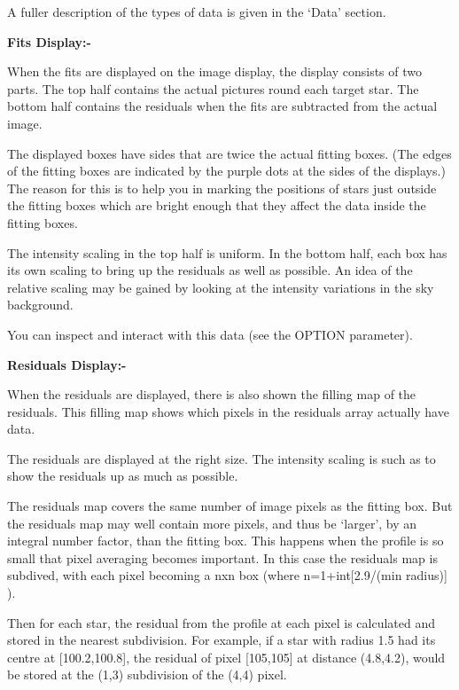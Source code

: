 \begin{small}
{{  A fuller description of the types of data is given in the `Data'
  section.

{\bf \hspace*{2em} Fits Display:-}

  When the fits are displayed on the image display, the display
  consists of two parts. The top half contains the actual pictures round
  each target star. The bottom half contains the residuals when the fits
  are subtracted from the actual image.

  The displayed boxes have sides that are twice the actual fitting
  boxes. (The edges of the fitting boxes are indicated by the purple
  dots at the sides of the displays.) The reason for this is to help
  you in marking the positions of stars just outside the fitting boxes
  which are bright enough that they affect the data inside the fitting
  boxes.

  The intensity scaling in the top half is uniform. In the bottom half,
  each box has its own scaling to bring up the residuals as well as
  possible. An idea of the relative scaling may be gained by looking at
  the intensity variations in the sky background.

  You can inspect and interact with this data (see the OPTION parameter).

{\bf \hspace*{2em} Residuals Display:-}

  When the residuals are displayed, there is also shown the filling map
  of the residuals. This filling map shows which pixels in the
  residuals array actually have data.

  The residuals are displayed at the right size. The intensity scaling is
  such as to show the residuals up as much as possible.

  The residuals map covers the same number of image pixels as the
  fitting box. But the residuals map may well contain more pixels, and
  thus be `larger', by an integral number factor, than the fitting box.
  This happens when the profile is so small that pixel averaging
  becomes important. In this case the residuals map is subdived, with
  each pixel becoming a nxn box (where n=1+int[2.9/(min radius)] ).

  Then for each star, the residual from the profile at each pixel is
  calculated and stored in the nearest subdivision. For example, if a
  star with radius 1.5 had its centre at [100.2,100.8], the residual of
  pixel [105,105] at distance (4.8,4.2), would be stored at the (1,3)
  subdivision of the (4,4) pixel.

}}
\end{small}
